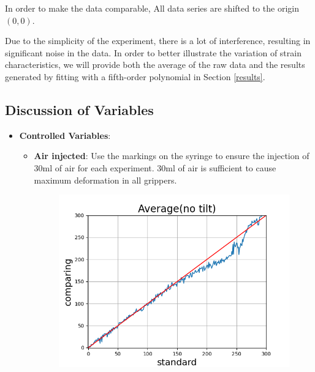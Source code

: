 \documentclass[conference]{IEEEtran}
\begin{document}
In order to make the data comparable, All data series are shifted to the origin $(0,0)$.

Due to the simplicity of the experiment, there is a lot of interference, resulting in significant noise in the data. In order to better illustrate the variation of strain characteristics, we will provide both the average of the raw data and the results generated by fitting with a fifth-order polynomial in Section \ref{results}.


\subsection{Discussion of Variables}

\begin{itemize}
    \item \textbf{Controlled Variables}: %
    \begin{itemize}
        \item \textbf{Air injected}: Use the markings on the syringe to ensure the injection of 30ml of air for each experiment. 30ml of air is sufficient to cause maximum deformation in all grippers.

\begin{figure}[htbp]
  \centering
  \begin{minipage}[t]{0.32\textwidth}
    \centering
    \includegraphics[width=\textwidth]{pics/Section3/Average0.png}


\end{minipage}
\end{figure}
\end{itemize}
\end{itemize}
\end{document}
